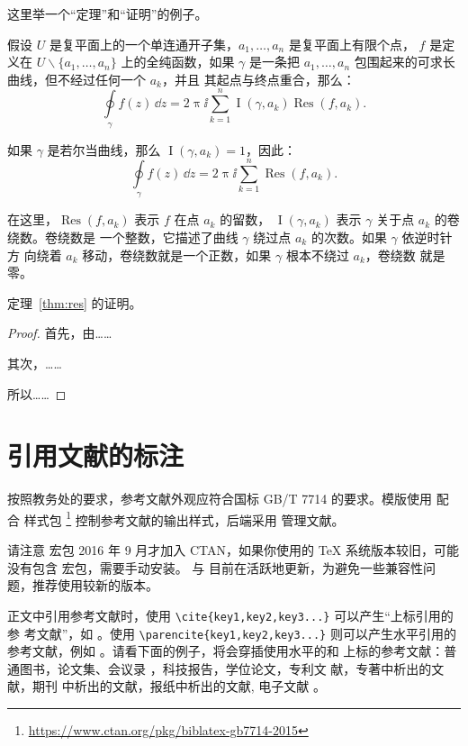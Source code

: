 \documentclass{sjtureport}
\begin{document}
这里举一个“定理”和“证明”的例子。
\begin{theorem}[留数定理]
	\label{thm:res}
	假设 $U$ 是复平面上的一个单连通开子集，$a_1, \ldots, a_n$ 是复平面上有限个点，
	$f$ 是定义在 $U \backslash \{a_1, \ldots, a_n\}$ 上的全纯函数，如果 $\gamma$
	是一条把 $a_1, \ldots, a_n$ 包围起来的可求长曲线，但不经过任何一个 $a_k$，并且
	其起点与终点重合，那么：
	\begin{equation}
		\label{eq:res}
		\oint\limits_\gamma f(z)\, \dd z = 2\uppi \ii \sum_{k=1}^n \operatorname{I}(\gamma, a_k) \operatorname{Res}(f, a_k).
	\end{equation}

	如果 $\gamma$ 是若尔当曲线，那么 $\operatorname{I}(\gamma, a_k) = 1$，因此：
	\begin{equation}
		\label{eq:resthm}
		\oint\limits_\gamma f(z)\, \dd z = 2\uppi \ii \sum_{k=1}^n \operatorname{Res}(f, a_k).
	\end{equation}

	在这里，$\operatorname{Res}(f, a_k)$ 表示 $f$ 在点 $a_k$ 的留数，
	$\operatorname{I}(\gamma, a_k)$ 表示 $\gamma$ 关于点 $a_k$ 的卷绕数。卷绕数是
	一个整数，它描述了曲线 $\gamma$ 绕过点 $a_k$ 的次数。如果 $\gamma$ 依逆时针方
	向绕着 $a_k$ 移动，卷绕数就是一个正数，如果 $\gamma$ 根本不绕过 $a_k$，卷绕数
	就是零。

	定理~\ref{thm:res} 的证明。

	\begin{proof}
		首先，由……

		其次，……

		所以……
	\end{proof}
\end{theorem}

\section{引用文献的标注}

按照教务处的要求，参考文献外观应符合国标 GB/T 7714 的要求。模版使用 \BibLaTeX{}
配合  样式包%
\footnote{\url{https://www.ctan.org/pkg/biblatex-gb7714-2015}}%
控制参考文献的输出样式，后端采用  管理文献。

请注意  宏包 2016 年 9 月才加入 CTAN，如果你使用的
\TeX{} 系统版本较旧，可能没有包含  宏包，需要手动安装。
\BibLaTeX{} 与  目前在活跃地更新，为避免一些兼容性问
题，推荐使用较新的版本。

正文中引用参考文献时，使用 \verb|\cite{key1,key2,key3...}| 可以产生“上标引用的参
考文献”，如 \cite{Yu2001,Cheng1999,LSC1957}。使用
\verb|\parencite{key1,key2,key3...}| 则可以产生水平引用的参考文献，例如
\parencite{Li1999,Jiang1989,Hopkinson1999}。请看下面的例子，将会穿插使用水平的和
上标的参考文献：普通图书\parencite{Yu2001,Jiang1998}，论文集、会议录
\cite{CSTAM1990}，科技报告\parencite{WHO1970}，学位论文\cite{Zhang1998}，专利文
献\parencite{Jiang1989,HBLZ2001}，专著中析出的文献\cite{Cheng1999,GBT2659}，期刊
中析出的文献\parencite{Li1999,Li2000}，报纸中析出的文献\cite{Ding2000}, 电子文献
\parencite{Jiang1999,Christine1998,Xiao2001}。
\end{document}
